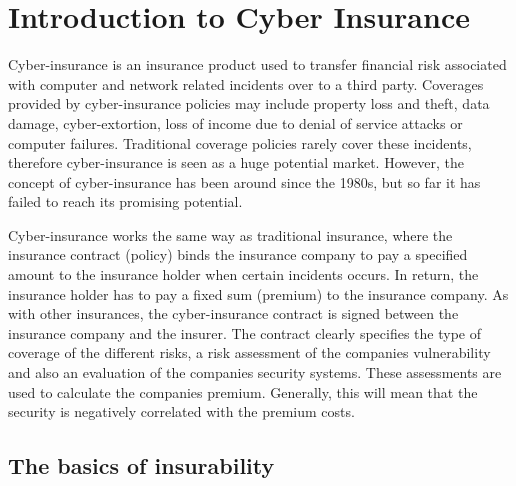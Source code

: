 \chapter{Introduction to Cyber Insurance}
\label{chp:introductionToCyberInsurance} 

Cyber-insurance is an insurance product used to transfer financial risk
associated with computer and network related incidents over to a third party.
 Coverages provided by cyber-insurance policies may include property loss and
theft, data damage, cyber-extortion, loss of income due to denial of service attacks or computer failures. \cite{washingtonpaper}
Traditional coverage policies rarely cover these incidents, therefore cyber-insurance is seen as a huge potential market. However, the concept of cyber-insurance has been around since the 1980s, but so far it has failed to reach its promising potential. 
  
 
Cyber-insurance works the same way as traditional insurance, where the insurance contract (policy)
 binds the insurance company to pay a specified amount to the insurance holder when certain incidents
  occurs. In return, the insurance holder has to pay a fixed sum (premium) to the insurance company.
   \cite{robinson2012incentives}
    As with other insurances, the cyber-insurance contract is signed between the insurance company and
     the insurer. The contract clearly specifies the type of coverage of the different risks, a risk
      assessment of the companies vulnerability and also an evaluation of the companies security
       systems. These assessments are used to calculate the companies premium.
 \cite{robinson2012incentives} Generally, this will mean that the security is negatively correlated with the premium costs.  

\section{The basics of insurability}

